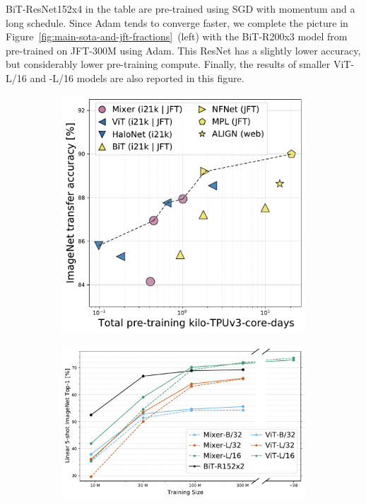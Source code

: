 BiT-ResNet152x4 in the table are pre-trained using SGD with momentum and a long schedule.
Since Adam tends to converge faster, we complete the picture in Figure~\ref{fig:main-sota-and-jft-fractions}~(left) with the BiT-R200x3 model from \citet{Dosovitskiy2021} pre-trained on JFT-300M using Adam.
This ResNet has a slightly lower accuracy, but considerably lower pre-training compute.
Finally, the results of smaller ViT-L/16 and \name{}-L/16 models are also reported in this figure.

\begin{figure}[tb]
\centering
\begin{subfigure}{.328\textwidth}
  \centering%
  \includegraphics[width=0.965\linewidth]{pics/sota_frontier.pdf}
\end{subfigure}%
\begin{subfigure}{.51\textwidth}
  \centering
  \includegraphics[width=1.0\linewidth]{pics/data_frac_5shot.pdf}

\end{subfigure}
\end{figure}
